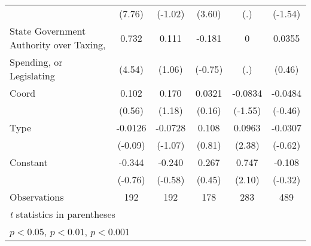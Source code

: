 \begin{table}[htbp]
\begin{tabular}{l*{5}{c}}
                                        &   (7.76)         &  (-1.02)         &   (3.60)         &      (.)         &  (-1.54)         \\
\addlinespace
State Government Authority over Taxing, &    0.732\sym{***}&    0.111         &   -0.181         &        0         &   0.0355         \\
Spending, or Legislating                &   (4.54)         &   (1.06)         &  (-0.75)         &      (.)         &   (0.46)         \\
\addlinespace
Coord                                   &    0.102         &    0.170         &   0.0321         &  -0.0834         &  -0.0484         \\
                                        &   (0.56)         &   (1.18)         &   (0.16)         &  (-1.55)         &  (-0.46)         \\
\addlinespace
Type                                    &  -0.0126         &  -0.0728         &    0.108         &   0.0963\sym{*}  &  -0.0307         \\
                                        &  (-0.09)         &  (-1.07)         &   (0.81)         &   (2.38)         &  (-0.62)         \\
\addlinespace
Constant                                &   -0.344         &   -0.240         &    0.267         &    0.747\sym{*}  &   -0.108         \\
                                        &  (-0.76)         &  (-0.58)         &   (0.45)         &   (2.10)         &  (-0.32)         \\
\midrule
Observations                            &      192         &      192         &      178         &      283         &      489         \\
\bottomrule
\multicolumn{6}{l}{\footnotesize \textit{t} statistics in parentheses}\\
\multicolumn{6}{l}{\footnotesize \sym{*} \(p<0.05\), \sym{**} \(p<0.01\), \sym{***} \(p<0.001\)}\\
\end{tabular}
\end{table}
